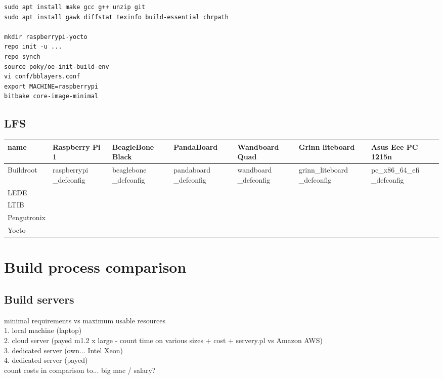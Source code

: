 \documentclass[printmode]{mgr}
\begin{document}
\begin{lstlisting}
sudo apt install make gcc g++ unzip git
sudo apt install gawk diffstat texinfo build-essential chrpath

mkdir raspberrypi-yocto
repo init -u ...
repo synch
source poky/oe-init-build-env
vi conf/bblayers.conf
export MACHINE=raspberrypi
bitbake core-image-minimal
\end{lstlisting}

\section{LFS}

\begin{landscape}

\begin{table}
  \begin{tabular}{| p{2.5cm} | p{3cm} | p{3cm} | p{3cm} | p{3cm} | p{3cm} | p{3cm} |}
    \hline
    name & Raspberry Pi 1 & BeagleBone Black & PandaBoard & Wandboard Quad & Grinn liteboard & Asus Eee PC 1215n \\
    \hline
    Buildroot & raspberrypi \_defconfig &  beaglebone \_defconfig & pandaboard \_defconfig & wandboard \_defconfig & grinn\_liteboard \_defconfig & pc\_x86\_64\_efi \_defconfig \\
    \hline
    LEDE & & & & & & \\
    \hline
    LTIB & & & & & & \\
    \hline
    Pengutronix & & & & & & \\
    \hline
    Yocto & & & & & & \\
    \hline
  \end{tabular}
\end{table}

\end{landscape}


\chapter{Build process comparison}
\label{chapter:methodology}


\section{Build servers}
minimal requirements vs maximum usable resources\\
1. local machine (laptop)\\
2. cloud server (payed m1.2 x large - count time on various sizes + cost + servery.pl vs Amazon AWS)\\
3. dedicated server (own... Intel Xeon)\\
4. dedicated server (payed)\\
count costs in comparison to... big mac / salary?
\end{document}
